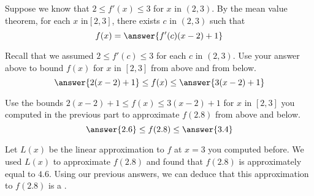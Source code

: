 \documentclass{ximera}
\begin{document}
\begin{exercise}
\begin{exercise}
\begin{exercise}
\begin{exercise}
\begin{exercise}
\begin{exercise}
\begin{multipleChoice}
\end{multipleChoice}
\begin{exercise}
Suppose we know that $2\le f'(x)\le 3$ for $x$ in $(2,3)$. By the mean value theorem, for each $x$ in$ [2,3]$, there exists $c$ in $(2,3)$ such that
\[
f(x)=\answer{f'(c)(x-2)+1}
\] 
\begin{exercise}
Recall that we assumed $2\le f'(c)\le 3$ for each $c$ in $(2,3)$. Use your answer above to bound $f(x)$ for $x$ in $[2,3]$ from above and from below.
\[
\answer{2(x-2)+1}\le f(x)\le \answer{3(x-2)+1}
\]
\begin{exercise}
Use the bounds $2(x-2)+1\le f(x)\le 3(x-2)+1$ for $x$ in $[2,3]$ you computed in the previous part to approximate $f(2.8)$ from above and below.
\[
\answer{2.6}\le f(2.8)\le \answer{3.4}
\]
\begin{exercise}
Let $L(x)$ be the linear approximation to $f$ at $x=3$ you computed before. We used $L(x)$ to approximate $f(2.8)$ and found that $f(2.8)$ is approximately equal to $4.6$. Using our previous answers, we can deduce that this approximation to $f(2.8)$ is a .
\end{exercise}
\end{exercise}
\end{exercise}
\end{exercise}
\end{exercise}
\end{exercise}
\end{exercise}
\end{exercise}
\end{exercise}
\end{exercise}
\end{document}
